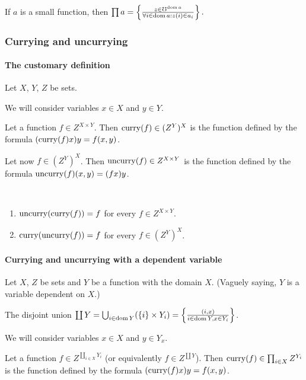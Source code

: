 \begin{obvious}
If $a$ is a small function, then $\prod a=\left\{ \frac{z\in\mho^{\operatorname{dom} a}}{\forall i\in\operatorname{dom} a:z(i)\in a_{i}}\right\}.$
\end{obvious}

\subsubsection{Currying and uncurrying}


\paragraph{The customary definition}

Let $X$, $Y$, $Z$ be sets.

We will consider variables $x\in X$ and $y\in Y$.

Let a function $f\in Z^{X\times Y}$. Then $\operatorname{curry}(f)\in(Z^{Y})^{X}$
is the function defined by the formula $(\operatorname{curry}(f)x)y=f(x,y)$.

Let now $f\in(Z^{Y})^{X}$. Then $\operatorname{uncurry}(f)\in Z^{X\times Y}$
is the function defined by the formula $\operatorname{uncurry}(f)(x,y)=(fx)y$.
\begin{obvious}
~
\begin{enumerate}
\item $\operatorname{uncurry}(\operatorname{curry}(f))=f$ for every $f\in Z^{X\times Y}$.
\item $\operatorname{curry}(\operatorname{uncurry}(f))=f$ for every $f\in(Z^{Y})^{X}$.
\end{enumerate}
\end{obvious}

\paragraph{Currying and uncurrying with a dependent variable}

Let $X$, $Z$ be sets and $Y$ be a function with the domain $X$.
(Vaguely saying, $Y$ is a variable dependent on $X$.)

The disjoint union $\coprod Y=\bigcup_{i\in\operatorname{dom} Y}(\{i\}\times Y_{i})=\left\{ \frac{(i,x)}{i\in\operatorname{dom} Y,x\in Y_{i}}\right\}$.

We will consider variables $x\in X$ and $y\in Y_{x}$.

Let a function $f\in Z^{\coprod_{i\in X}Y_{i}}$
(or equivalently $f\in Z^{\coprod Y}$). Then $\operatorname{curry}(f)\in\prod_{i\in X}Z^{Y_{i}}$
is the function defined by the formula $(\operatorname{curry}(f)x)y=f(x,y)$.

